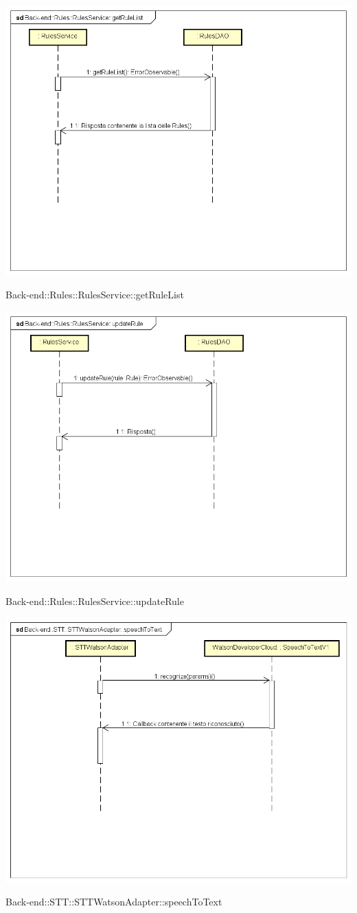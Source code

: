 \includegraphics[width=\textwidth,height=\textheight,keepaspectratio]{images/diagrams/back-end/Ufficial_Backend/Back-end__Rules__RulesService__getRuleList.png} 	\caption{Back-end::Rules::RulesService::getRuleList}
\includegraphics[width=\textwidth,height=\textheight,keepaspectratio]{images/diagrams/back-end/Ufficial_Backend/Back-end__Rules__RulesService__updateRule.png} 	\caption{Back-end::Rules::RulesService::updateRule}
\includegraphics[width=\textwidth,height=\textheight,keepaspectratio]{images/diagrams/back-end/Ufficial_Backend/Back-end__STT__STTWatsonAdapter__speechToText.png} 	\caption{Back-end::STT::STTWatsonAdapter::speechToText}
